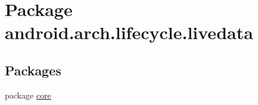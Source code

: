 \hypertarget{namespaceandroid_1_1arch_1_1lifecycle_1_1livedata}{}\section{Package android.\+arch.\+lifecycle.\+livedata}
\label{namespaceandroid_1_1arch_1_1lifecycle_1_1livedata}
\subsection*{Packages}
\begin{DoxyCompactItemize}
\item 
package \mbox{\hyperlink{namespaceandroid_1_1arch_1_1lifecycle_1_1livedata_1_1core}{core}}
\end{DoxyCompactItemize}
